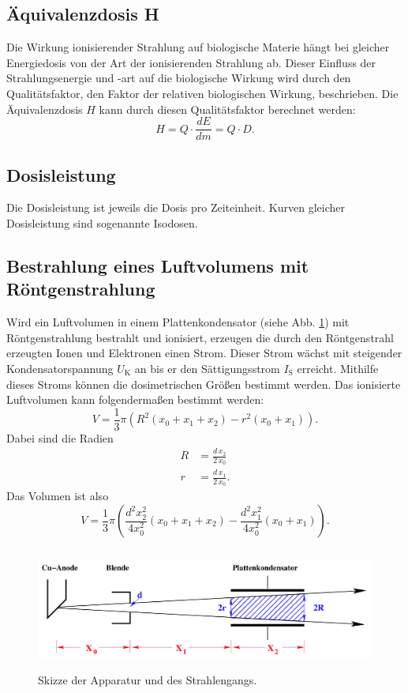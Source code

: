 \subsection{Äquivalenzdosis H}
Die Wirkung ionisierender Strahlung auf biologische Materie
hängt bei gleicher Energiedosis von der Art der ionisierenden
Strahlung ab. Dieser Einfluss der Strahlungsenergie und -art
auf die biologische Wirkung wird durch den Qualitätsfaktor,
den Faktor der relativen biologischen Wirkung,
beschrieben.
Die Äquivalenzdosis $H$ kann durch diesen Qualitätsfaktor
berechnet werden:
\begin{equation*}
    H = Q \cdot \frac{dE}{dm} = Q \cdot D.
    \label{eqn:Aequivalenzdosis}
\end{equation*}

\subsection{Dosisleistung}
Die Dosisleistung ist jeweils die Dosis pro Zeiteinheit.
Kurven gleicher Dosisleistung sind sogenannte Isodosen.

\subsection{Bestrahlung eines Luftvolumens mit Röntgenstrahlung}
Wird ein Luftvolumen in einem Plattenkondensator
(siehe Abb. \ref{fig:Strahlgeometrie}) mit
Röntgenstrahlung bestrahlt und ionisiert, erzeugen die durch
den Röntgenstrahl erzeugten Ionen und Elektronen einen Strom.
Dieser Strom wächst mit steigender Kondensatorspannung 
$U_\text{K}$ an bis er den Sättigungsstrom $I_\text{S}$
erreicht. Mithilfe dieses Stroms können die dosimetrischen
Größen bestimmt werden.
\newline
Das ionisierte Luftvolumen kann folgendermaßen bestimmt werden:
\begin{equation*}
    V = \frac{1}{3} \pi (R^2 (x_0 + x_1 + x_2) - r^2 (x_0 + x_1)). 
\end{equation*}
Dabei sind die Radien
\begin{align*}
    R &= \frac{d \, x_2}{2 \, x_0} \\
    r &= \frac{d \, x_1}{2 \, x_0}. 
\end{align*}
Das Volumen ist also 
\begin{equation}
    V = \frac{1}{3} \pi \left(\frac{d^2 x_2^2}{4 x_0^2}(x_0 + x_1 + x_2) - \frac{d^2 x_1^2}{4 x_0^2}(x_0 + x_1)\right).
    \label{eqn:V}
\end{equation}

\begin{figure}
    \centering
    \includegraphics[width=12cm, height=4cm]{build/strahl.png}
    \caption{Skizze der Apparatur und des Strahlengangs. \cite{V607}}
    \label{fig:Strahlgeometrie}
\end{figure}
